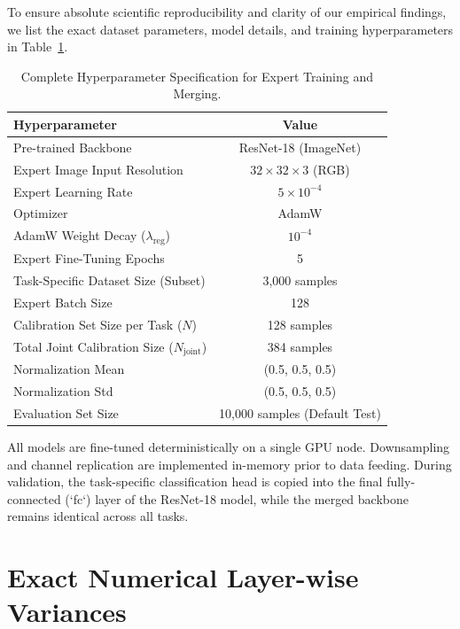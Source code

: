 \documentclass{article}
\theoremstyle{plain}
\theoremstyle{definition}
\theoremstyle{remark}
\begin{document}
To ensure absolute scientific reproducibility and clarity of our empirical findings, we list the exact dataset parameters, model details, and training hyperparameters in Table~\ref{tab:hyperparams}.

\begin{table}[h]
\caption{Complete Hyperparameter Specification for Expert Training and Merging.}
\label{tab:hyperparams}
\vskip 0.15in
\begin{center}
\begin{small}
\begin{sc}
\begin{tabular}{lc}
\toprule
Hyperparameter & Value \\
\midrule
Pre-trained Backbone & ResNet-18 (ImageNet) \\
Expert Image Input Resolution & $32 \times 32 \times 3$ (RGB) \\
Expert Learning Rate & $5 \times 10^{-4}$ \\
Optimizer & AdamW \\
AdamW Weight Decay ($\lambda_{\text{reg}}$) & $10^{-4}$ \\
Expert Fine-Tuning Epochs & 5 \\
Task-Specific Dataset Size (Subset) & 3,000 samples \\
Expert Batch Size & 128 \\
Calibration Set Size per Task ($N$) & 128 samples \\
Total Joint Calibration Size ($N_{\text{joint}}$) & 384 samples \\
Normalization Mean & (0.5, 0.5, 0.5) \\
Normalization Std & (0.5, 0.5, 0.5) \\
Evaluation Set Size & 10,000 samples (Default Test) \\
\bottomrule
\end{tabular}
\end{sc}
\end{small}
\end{center}
\vskip -0.1in
\end{table}

All models are fine-tuned deterministically on a single GPU node. Downsampling and channel replication are implemented in-memory prior to data feeding. During validation, the task-specific classification head is copied into the final fully-connected (`fc`) layer of the ResNet-18 model, while the merged backbone remains identical across all tasks.

\section{Exact Numerical Layer-wise Variances}
\label{app:layer_vars}
\end{document}

